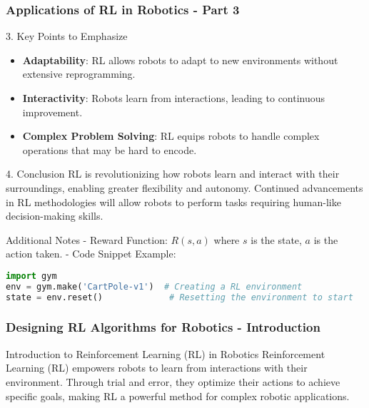 \documentclass{beamer}
\begin{document}
\begin{frame}[fragile]
    \frametitle{Applications of RL in Robotics - Part 3}
    \begin{block}{3. Key Points to Emphasize}
        \begin{itemize}
            \item \textbf{Adaptability}: RL allows robots to adapt to new environments without extensive reprogramming.
            \item \textbf{Interactivity}: Robots learn from interactions, leading to continuous improvement.
            \item \textbf{Complex Problem Solving}: RL equips robots to handle complex operations that may be hard to encode.
        \end{itemize}
    \end{block}

    \begin{block}{4. Conclusion}
        RL is revolutionizing how robots learn and interact with their surroundings, enabling greater flexibility and autonomy. Continued advancements in RL methodologies will allow robots to perform tasks requiring human-like decision-making skills.
    \end{block}

    \begin{block}{Additional Notes}
        - Reward Function: \( R(s, a) \) where \( s \) is the state, \( a \) is the action taken.
        - Code Snippet Example:
        \begin{lstlisting}[language=Python]
import gym
env = gym.make('CartPole-v1')  # Creating a RL environment
state = env.reset()             # Resetting the environment to start
        \end{lstlisting}
        \end{block}
\end{frame}

\begin{frame}[fragile]
    \frametitle{Designing RL Algorithms for Robotics - Introduction}
    \begin{block}{Introduction to Reinforcement Learning (RL) in Robotics}
        Reinforcement Learning (RL) empowers robots to learn from interactions with their environment. Through trial and error, they optimize their actions to achieve specific goals, making RL a powerful method for complex robotic applications.
    \end{block}
\end{frame}
\end{document}
